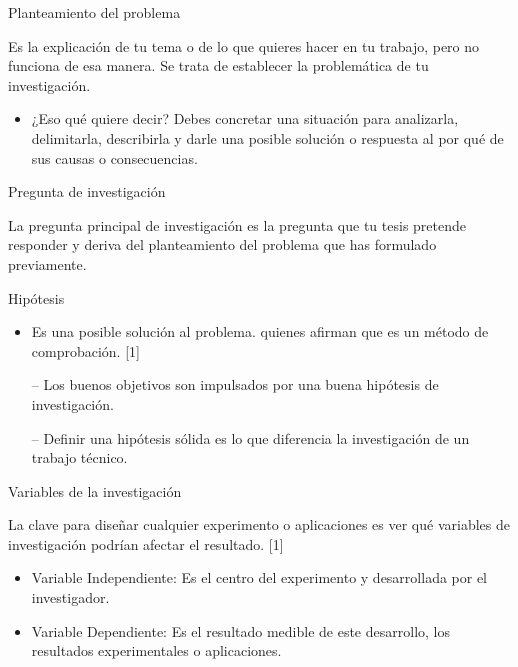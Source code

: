 \begin{frame}{Planteamiento del problema}
\begin{block}{}
Es la explicación de tu tema o de lo que quieres hacer en tu trabajo, pero no funciona de esa manera. Se trata de establecer la problemática de tu investigación. 
\begin{itemize}
    \item ¿Eso qué quiere decir? Debes concretar una situación para analizarla, delimitarla, describirla y darle una posible solución o respuesta al por qué de sus causas o consecuencias.
\end{itemize}
\end{block}   
\end{frame}

\begin{frame}{Pregunta de investigación}
\begin{block}{}
 La pregunta principal de investigación es la pregunta que tu tesis pretende responder y deriva del planteamiento del problema que has formulado previamente. 
\end{block}   
\end{frame}

\begin{frame}{Hipótesis}
\begin{block}{}
\begin{itemize}
    \item  Es una posible solución al problema. quienes afirman que es un método de comprobación. [1]
    \item [--] Los buenos objetivos son impulsados por una buena hipótesis de investigación.
    \item [--] Definir una hipótesis sólida es lo que diferencia la investigación de un trabajo técnico.
\end{itemize}
\end{block} 
\end{frame}

\begin{frame}{Variables de la investigación}
\begin{block}{}
La clave para diseñar cualquier experimento o aplicaciones es ver qué variables de investigación podrían afectar el resultado. [1]
 \begin{itemize}
     \item Variable Independiente: Es el centro del experimento y desarrollada por el investigador.
     \item Variable Dependiente: Es el resultado medible de este desarrollo, los resultados experimentales o aplicaciones.
 \end{itemize}
\end{block}  
\end{frame}

